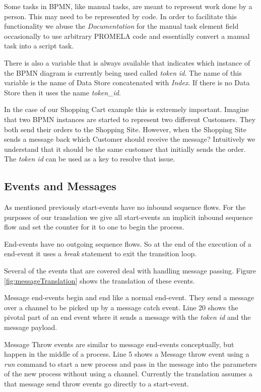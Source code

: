\documentclass[11pt,twocolumn]{article}
\begin{document}
Some tasks in BPMN, like manual tasks, are meant to represent work done by a person. This may need to be represented by code. In order to facilitate this functionality we abuse the \emph{Documentation} for the manual task element field occasionally to use arbitrary PROMELA code and essentially convert a manual task into a script task.

There is also a variable that is always available that indicates which instance of the BPMN diagram is currently being used called \emph{token id}. The name of this variable is the name of Data Store concatenated with \emph{Index}. If there is no Data Store then it uses the name \emph{token\_id}. 

In the case of our Shopping Cart example this is extremely important. Imagine that two BPMN instances are started to represent two different Customers. They both send their orders to the Shopping Site. However, when the Shopping Site sends a message back which Customer should receive the message? Intuitively we understand that it should be the same customer that initially sends the order. The \emph{token id} can be used as a key to resolve that issue.



\subsection{Events and Messages}

As mentioned previously start-events have no inbound sequence flows. For the purposes of our translation we give all start-events an implicit inbound sequence flow and set the counter for it to one to begin the process.

End-events have no outgoing sequence flows. So at the end of the execution of a end-event it uses a \emph{break} statement to exit the transition loop.

Several of the events that are covered deal with handling message passing. Figure \ref{fig:messageTranslation} shows the translation of these events.

Message end-events begin and end like a normal end-event. They send a message over a channel to be picked up by a message catch event. Line 20 shows the pivotal part of an end event where it sends a message with the \emph{token id} and the message payload. 

Message Throw events are similar to message end-events conceptually, but happen in the middle of a process. Line 5 shows a Message throw event using a \emph{run} command to start a new process and pass in the message into the parameters of the new process without using a channel. Currently the translation assumes a that message send throw events go directly to a start-event. 
\end{document}
